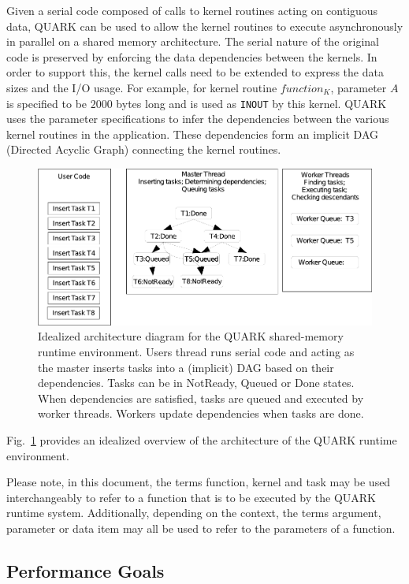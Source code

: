 \documentclass[11pt,letterpaper]{report}
\begin{document}
Given a serial code composed of calls to kernel routines acting on
contiguous data, QUARK can be used to allow the kernel routines to
execute asynchronously in parallel on a shared memory architecture.
The serial nature of the original code is preserved by enforcing the
data dependencies between the kernels.  In order to support this, the
kernel calls need to be extended to express the data sizes and the I/O
usage.  For example, for kernel routine $function_K$, parameter $A$ is
specified to be $2000$ bytes long and is used as \verb|INOUT| by this
kernel.  QUARK uses the parameter specifications to infer the
dependencies between the various kernel routines in the application.
  These dependencies form an implicit DAG (Directed Acyclic Graph)
 connecting the kernel routines.
\begin{figure}[bt]
  \centering \includegraphics[trim=0 0 0 0, clip,
    width=1.0\columnwidth]{scheduler_architecture}
  \caption{Idealized architecture diagram for the QUARK shared-memory
    runtime environment.  Users thread runs serial code and acting as
    the master inserts tasks into a (implicit) DAG based on their
    dependencies.  Tasks can be in NotReady, Queued or Done states.
    When dependencies are satisfied, tasks are queued and executed by
    worker threads.  Workers update dependencies when tasks are done.}
  \label{fig:scheduler-architecture}
\end{figure}
Fig.~\ref{fig:scheduler-architecture} provides an idealized overview
of the architecture of the QUARK runtime environment.

Please note, in this document, the terms function, kernel and task may
be used interchangeably to refer to a function that is to be executed
by the QUARK runtime system.  Additionally, depending on the context,
the terms argument, parameter or data item may all be used to refer to
the parameters of a function.


\subsection{Performance Goals}
\end{document}
